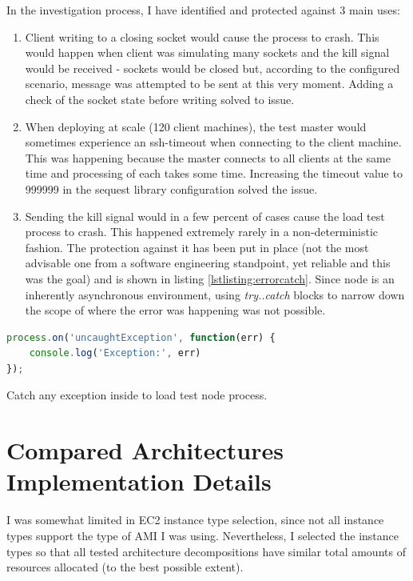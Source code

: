 \documentclass{uvamscse}
\begin{document}
In the investigation process, I have identified and protected against 3 main uses:

\begin{enumerate}
  \item Client writing to a closing socket would cause the process to crash. This would happen when client was simulating many sockets and the kill signal would be received - sockets would be closed but, according to the configured scenario, message was attempted to be sent at this very moment. Adding a check of the socket state before writing solved to issue.
  \item When deploying at scale (120 client machines), the test master would sometimes experience an ssh-timeout when connecting to the client machine. This was happening because the master connects to all clients at the same time and processing of each takes some time. Increasing the timeout value to 999999 in the sequest library configuration solved the issue.
  \item Sending the kill signal would in a few percent of cases cause the load test process to crash. This happened extremely rarely in a non-deterministic fashion. The protection against it has been put in place (not the most advisable one from a software engineering standpoint, yet reliable and this was the goal) and is shown in listing \ref{lstlisting:errorcatch}. Since node is an inherently asynchronous environment, using \textit{try..catch} blocks to narrow down the scope of where the error was happening was not possible.
\end{enumerate}

\begin{sourcecode}[H]
\begin{lstlisting}[language=javascript]
process.on('uncaughtException', function(err) {
    console.log('Exception:', err)
});
\end{lstlisting}
\caption{Catch any exception inside to load test node process.}
\label{lstlisting:errorcatch}
\end{sourcecode}

\section{Compared Architectures Implementation Details}\label{Compared Architectures Implementation Details}

I was somewhat limited in EC2 instance type selection, since not all instance types support the type of AMI I was using. Nevertheless, I selected the instance types so that all tested architecture decompositions have similar total amounts of resources allocated (to the best possible extent).
\end{document}
